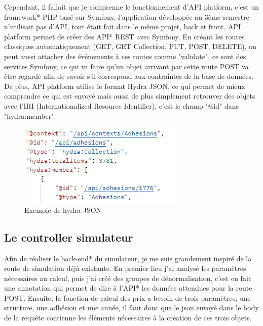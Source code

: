 \documentclass[a4paper,12pt]{report}
\begin{document}
Cependant, il fallait que je comprenne le fonctionnement d'API platform, c'est un framework* PHP basé sur Symfony, l'application développée au 3ème semestre n'utilisait pas d'API, tout était fait dans le même projet, back et front. API platform permet de créer des API* REST avec Symfony. En créant les routes classiques automatiquement (GET, GET Collection, PUT, POST, DELETE), on peut aussi attacher des événements à ces routes comme "validate", ce sont des services Symfony, ce qui va faire qu'un objet arrivant par cette route POST va être regardé afin de savoir s'il correspond aux contraintes de la base de données. De plus, API platform utilise le format Hydra JSON, ce qui permet de mieux comprendre ce qui est envoyé mais aussi de plus simplement retrouver des objets avec l'IRI (Internationalized Resource Identifier), c'est le champ "@id" dans "hydra:member".

\begin{figure}[ht]
    \centering
    \includegraphics[scale=0.8]{hydraJSON.png}
    \caption{Exemple de hydra JSON}
    \label{fig:hyda-json}
\end{figure}

\subsection{Le controller simulateur}
Afin de réaliser le back-end* du simulateur, je me suis grandement inspiré de la route de simulation déjà existante. En premier lieu j'ai analysé les paramètres nécessaires au calcul, puis j'ai créé des groupes de dénormalisation, c'est en fait une annotation qui permet de dire à l'API* les données attendues pour la route POST. Ensuite, la fonction de calcul des prix a besoin de trois paramètres, une structure, une adhésion et une année, il faut donc que le json envoyé dans le body de la requête contienne les éléments nécessaires à la création de ces trois objets.
\end{document}
